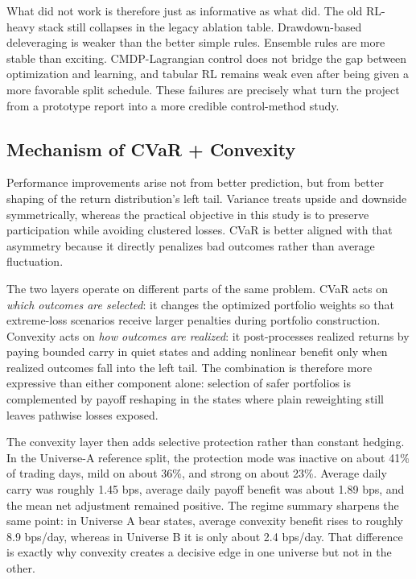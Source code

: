 \documentclass[10pt,twocolumn]{article}
\begin{document}
What did not work is therefore just as informative as what did. The old
RL-heavy stack still collapses in the legacy ablation table. Drawdown-based
deleveraging is weaker than the better simple rules. Ensemble rules are more
stable than exciting. CMDP-Lagrangian control does not bridge the gap between
optimization and learning, and tabular RL remains weak even after being given a
more favorable split schedule. These failures are precisely what turn the
project from a prototype report into a more credible control-method study.

\subsection{Mechanism of CVaR + Convexity}

Performance improvements arise not from better prediction, but from better
shaping of the return distribution's left tail. Variance treats upside and
downside symmetrically, whereas the practical objective in this study is to
preserve participation while avoiding clustered losses. CVaR is better aligned
with that asymmetry because it directly penalizes bad outcomes rather than
average fluctuation.

The two layers operate on different parts of the same problem. CVaR acts on
\emph{which outcomes are selected}: it changes the optimized portfolio weights
so that extreme-loss scenarios receive larger penalties during portfolio
construction. Convexity acts on \emph{how outcomes are realized}: it
post-processes realized returns by paying bounded carry in quiet states and
adding nonlinear benefit only when realized outcomes fall into the left tail.
The combination is therefore more expressive than either component alone:
selection of safer portfolios is complemented by payoff reshaping in the states
where plain reweighting still leaves pathwise losses exposed.

The convexity layer then adds selective protection rather than constant
hedging. In the Universe-A reference split, the protection mode was inactive on
about 41\% of trading days, mild on about 36\%, and strong on about 23\%.
Average daily carry was roughly 1.45 bps, average daily payoff benefit was
about 1.89 bps, and the mean net adjustment remained positive. The regime
summary sharpens the same point: in Universe A bear states, average convexity
benefit rises to roughly 8.9 bps/day, whereas in Universe B it is only about
2.4 bps/day. That difference is exactly why convexity creates a decisive edge
in one universe but not in the other.
\end{document}
